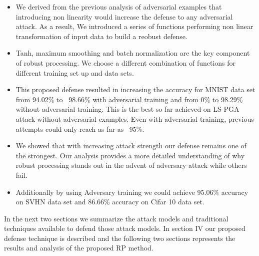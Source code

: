 \documentclass[conference]{IEEEtran}
\begin{document}
\begin{itemize}
    \item We derived from the previous analysis of adversarial examples that introducing non linearity would increase the defense to any adversarial attack. As a result, We introduced a series of functions performing non linear transformation of input data to build a reobust defense.
    \item Tanh, maximum smoothing and batch normalization are the key component of robust processing. We choose a different combination of functions for different training set up and data sets.
    \item This proposed defense resulted in increasing the accuracy for MNIST data set from 94.02\% to ~98.66\% with adversarial training and from 0\% to 98.29\% without adversarial training. This is the best so far achieved on LS-PGA attack without adversarial examples. Even with adversarial training, previous attempts could only reach as far as ~95\%. 
    \item We showed that with increasing attack strength our defense remains one of the strongest. Our analysis provides a more detailed understanding of why robust processing stands out in the advent of adversary attack while others fail.
    \item Additionally by using Adversary training we could achieve 95.06\% accuracy on SVHN data set and 86.66\% accuracy on Cifar 10 data set.
    
\end{itemize}

In the next two sections we summarize the attack models and traditional techniques available to defend those attack models. In section IV our proposed defense technique is described and the following two sections represents the results and analysis of the proposed RP method.
\end{document}
